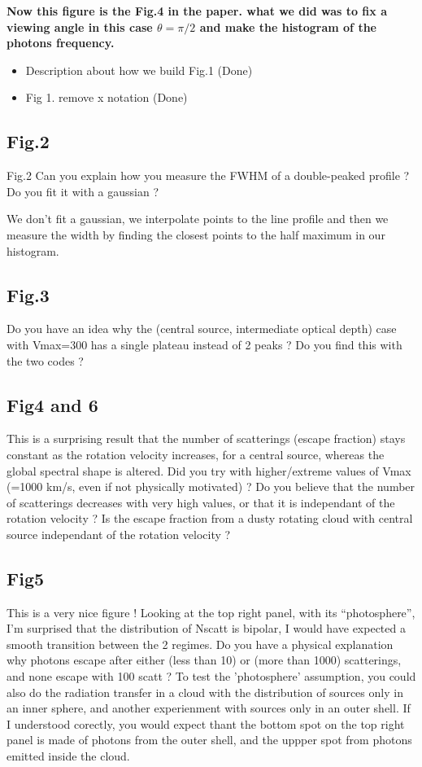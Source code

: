 \documentclass[12pt]{article}
\begin{document}
\textbf{Now this figure is the Fig.4 in the paper. what we did was to fix a viewing angle in this case $\theta= \pi/2$ and make the histogram of the photons frequency.}

\begin{itemize}
\item Description about how we build Fig.1 (Done)
\item Fig 1. remove x notation (Done)
\end{itemize}

\subsection*{Fig.2}

Fig.2 Can you explain how you measure the FWHM of a double-peaked profile ? Do you fit it with a gaussian ?


We don't fit a gaussian, we interpolate points to the line profile and then  we measure the width by finding
the closest points to the half maximum in our histogram.

\subsection*{Fig.3}

Do you have an idea why the (central source, intermediate optical depth) case with Vmax=300 has a single plateau instead of 2 peaks ? Do you find this with the two codes ?


\subsection*{Fig4 and 6}

This is a surprising result that the number of scatterings (escape fraction) stays constant as the rotation velocity increases, for a central source, whereas the global spectral shape is altered. Did you try with higher/extreme values of Vmax (=1000 km/s, even if not physically motivated) ? Do you believe that the number of scatterings decreases with very high values, or that it is independant of the rotation velocity ? Is the escape fraction from a dusty rotating cloud with central source independant of the rotation velocity ?

\subsection*{Fig5}
This is a very nice figure ! Looking at the top right panel, with its “photosphere”, I’m surprised that the distribution of Nscatt is bipolar, I would have expected a smooth transition between the 2 regimes. Do you have a physical explanation why photons escape after either (less than 10) or (more than 1000) scatterings, and none escape with 100 scatt ? To test the ’photosphere’ assumption, you could also do the radiation transfer in a cloud with the distribution of sources only in an inner sphere, and another experienment with sources only in an outer shell. If I understood corectly, you would expect thant the bottom spot on the top right panel is made of photons from the outer shell, and the uppper spot from photons emitted inside the cloud.
\end{document}
